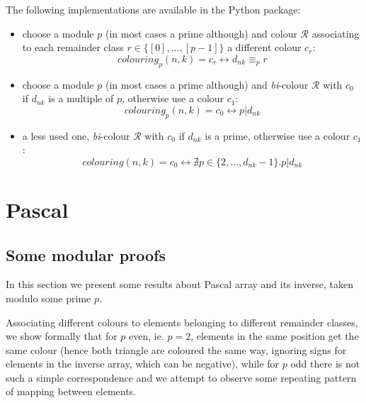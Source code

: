 \documentclass[11pt,a4paper]{article} %
\begin{document}
    The following implementations are available in the Python package:
    \begin{itemize}
        \item choose a module $p$ (in most cases a prime although) and
            colour $\mathcal{R}$ associating to each remainder class 
            $r \in \lbrace[0],\ldots,[p-1]\rbrace$
            a different colour $c_r$:
            \begin{displaymath}
                colouring_{p}(n,k) = c_{r} \leftrightarrow d_{nk} \equiv_{p} r
            \end{displaymath}
        \item choose a module $p$ (in most cases a prime although) and
            \emph{bi}-colour $\mathcal{R}$ with $c_0$ if $d_{nk}$ 
            is a multiple of $p$, otherwise use a colour $c_1$:
            \begin{displaymath}
                colouring_{p}(n,k) = c_{0} \leftrightarrow p | d_{nk}
            \end{displaymath}
        \item a less used one, \emph{bi}-colour $\mathcal{R}$ with $c_0$ 
            if $d_{nk}$ is a prime, otherwise use a colour $c_1$:
            \begin{displaymath}
                colouring(n,k) = c_{0} \leftrightarrow 
                    \nexists p\in\lbrace 2,\ldots,d_{nk}-1\rbrace.p|d_{nk} 
            \end{displaymath}
    \end{itemize}

    \section{Pascal}

    \subsection{Some modular proofs}
    
    In this section we present some results about Pascal array and its
    inverse, taken modulo some prime $p$. 
    
    Associating different colours to elements belonging to different 
    remainder classes, we show
    formally that for $p$ even, ie. $p=2$, elements in the same
    position get the same colour (hence both triangle are coloured the
    same way, ignoring signs for elements in the inverse array, which
    can be negative), while for $p$ odd there is not such a 
    simple correspondence and we
    attempt to observe some repeating pattern of mapping between
    elements.
\end{document}
